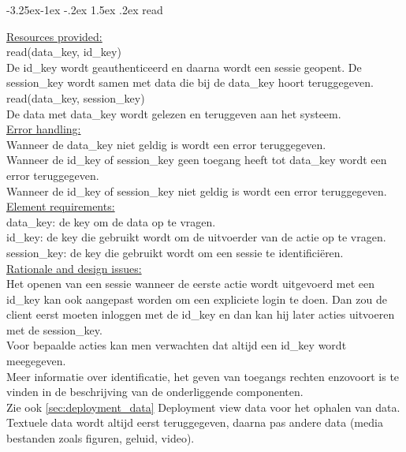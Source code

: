 \documentclass[a4paper,10pt]{article}
\makeatletter
\renewcommand\paragraph{\@startsection{paragraph}{4}{\z@}%
  {-3.25ex\@plus -1ex \@minus -.2ex}%
  {1.5ex \@plus .2ex}%
  {\normalfont\normalsize\bfseries}}
\makeatother
\begin{document}
\paragraph{read}

\underline{Resources provided:}\\
read(data\_key, id\_key)\\
\indent De id\_key wordt geauthenticeerd en daarna wordt een sessie geopent.  De session\_key wordt samen met data die bij de data\_key hoort teruggegeven.\\
read(data\_key, session\_key)\\
\indent De data met data\_key wordt gelezen en teruggeven aan het systeem.\\

\underline{Error handling:}\\
Wanneer de data\_key niet geldig is wordt een error teruggegeven.\\
Wanneer de id\_key of session\_key geen toegang heeft tot data\_key wordt een error teruggegeven.\\
Wanneer de id\_key of session\_key niet geldig is wordt een error teruggegeven.\\

\underline{Element requirements:}\\
data\_key: de key om de data op te vragen.\\
id\_key: de key die gebruikt wordt om de uitvoerder van de actie op te vragen.\\
session\_key: de key die gebruikt wordt om een sessie te identifici\"{e}ren.\\

\underline{Rationale and design issues:}\\
Het openen van een sessie wanneer de eerste actie wordt uitgevoerd met een id\_key kan ook aangepast worden om een expliciete login te doen.  Dan zou de client eerst moeten inloggen met de id\_key en dan kan hij later acties uitvoeren met de session\_key.\\
Voor bepaalde acties kan men verwachten dat altijd een id\_key wordt meegegeven.\\
Meer informatie over identificatie, het geven van toegangs rechten enzovoort is te vinden in de beschrijving van de onderliggende componenten.\\
Zie ook \ref{sec:deployment_data} Deployment view data voor het ophalen van data.  Textuele data wordt altijd eerst teruggegeven, daarna pas andere data (media bestanden zoals figuren, geluid, video).
\end{document}
